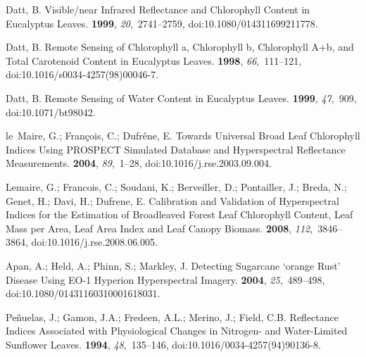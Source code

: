 \documentclass[remotesensing,article,accept,moreauthors,pdftex]{Definitions/mdpi}
\begin{document}
\begin{thebibliography}{999}
Datt, B.
\newblock Visible/near Infrared Reflectance and Chlorophyll Content in
  {{Eucalyptus}} Leaves.
 {\bf 1999}, {\em
  20},~2741--2759, doi:10.1080/014311699211778.

Datt, B.
\newblock Remote {{Sensing}} of {{Chlorophyll}} a, {{Chlorophyll}} b,
  {{Chlorophyll}} A+b, and {{Total Carotenoid
  Content}} in {{Eucalyptus Leaves}}.
 {\bf 1998}, {\em 66},~111--121, doi:10.1016/s0034-4257(98)00046-7.

Datt, B.
\newblock Remote {{Sensing}} of {{Water Content}} in {{Eucalyptus Leaves}}.
 {\bf 1999}, {\em 47},~909, doi:10.1071/bt98042.

le~Maire, G.; Fran{\c c}ois, C.; Dufr{\^e}ne, E.
\newblock Towards Universal Broad Leaf Chlorophyll Indices Using {{PROSPECT}}
  Simulated Database and Hyperspectral Reflectance Measurements.
 {\bf 2004}, {\em 89},~1--28, doi:10.1016/j.rse.2003.09.004.

Lemaire, G.; Francois, C.; Soudani, K.; Berveiller, D.; Pontailler, J.; Breda,
  N.; Genet, H.; Davi, H.; Dufrene, E.
\newblock Calibration and Validation of Hyperspectral Indices for the
  Estimation of Broadleaved Forest Leaf Chlorophyll Content, Leaf Mass per
  Area, Leaf Area Index and Leaf Canopy Biomass.
 {\bf 2008}, {\em
  112},~3846--3864, doi:10.1016/j.rse.2008.06.005.

Apan, A.; Held, A.; Phinn, S.; Markley, J.
\newblock Detecting Sugarcane `orange Rust' Disease Using {{EO}}-1 {{Hyperion}}
  Hyperspectral Imagery.
 {\bf 2004}, {\em
  25},~489--498, doi:10.1080/01431160310001618031.

Pe{\~n}uelas, J.; Gamon, J.A.; Fredeen, A.L.; Merino, J.; Field, C.B.
\newblock Reflectance Indices Associated with Physiological Changes in
  Nitrogen- and Water-Limited Sunflower Leaves.
 {\bf 1994}, {\em 48},~135--146, doi:10.1016/0034-4257(94)90136-8.


\end{thebibliography}
\end{document}

